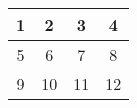 \begin{tabular}{|c|c|c|c|}
\hline
1 & 2 & 3 & 4 \\
\hline
5 & 6 & 7 & 8 \\
\hline
9 & 10 & 11 & 12 \\
\hline
\end{tabular}